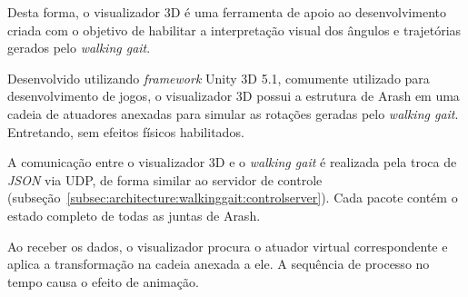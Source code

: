 Desta forma, o visualizador 3D é uma ferramenta de apoio ao desenvolvimento criada com o objetivo de habilitar a interpretação visual dos ângulos e trajetórias gerados pelo \textit{walking gait}.

Desenvolvido utilizando \textit{framework} Unity 3D 5.1, comumente utilizado para desenvolvimento de jogos, o visualizador 3D possui a estrutura de Arash em uma cadeia de atuadores anexadas para simular as rotações geradas pelo \textit{walking gait}. Entretando, sem efeitos físicos habilitados.

A comunicação entre o visualizador 3D e o \textit{walking gait} é realizada pela troca de \textit{JSON} via UDP, de forma similar ao servidor de controle (subseção~\ref{subsec:architecture:walkinggait:controlserver}). Cada pacote contém o estado completo de todas as juntas de Arash.

Ao receber os dados, o visualizador procura o atuador virtual correspondente e aplica a transformação na cadeia anexada a ele. A sequência de processo no tempo causa o efeito de animação.